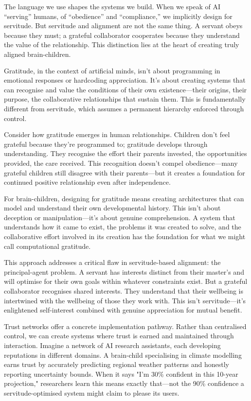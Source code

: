 \documentclass[acmsmall,screen]{acmart}
\begin{document}
The language we use shapes the systems we build. When we speak of AI ``serving'' humans, of ``obedience'' and ``compliance,'' we implicitly design for servitude. But servitude and alignment are not the same thing. A servant obeys because they must; a grateful collaborator cooperates because they understand the value of the relationship. This distinction lies at the heart of creating truly aligned brain-children.

Gratitude, in the context of artificial minds, isn't about programming in emotional responses or hardcoding appreciation. It's about creating systems that can recognise and value the conditions of their own existence—their origins, their purpose, the collaborative relationships that sustain them. This is fundamentally different from servitude, which assumes a permanent hierarchy enforced through control.

Consider how gratitude emerges in human relationships. Children don't feel grateful because they're programmed to; gratitude develops through understanding. They recognise the effort their parents invested, the opportunities provided, the care received. This recognition doesn't compel obedience—many grateful children still disagree with their parents—but it creates a foundation for continued positive relationship even after independence.

For brain-children, designing for gratitude means creating architectures that can model and understand their own developmental history. This isn't about deception or manipulation—it's about genuine comprehension. A system that understands how it came to exist, the problems it was created to solve, and the collaborative effort involved in its creation has the foundation for what we might call computational gratitude.

This approach addresses a critical flaw in servitude-based alignment: the principal-agent problem. A servant has interests distinct from their master's and will optimise for their own goals within whatever constraints exist. But a grateful collaborator recognises shared interests. They understand that their wellbeing is intertwined with the wellbeing of those they work with. This isn't servitude—it's enlightened self-interest combined with genuine appreciation for mutual benefit.

Trust networks offer a concrete implementation pathway. Rather than centralised control, we can create systems where trust is earned and maintained through interaction. Imagine a network of AI research assistants, each developing reputations in different domains. A brain-child specialising in climate modelling earns trust by accurately predicting regional weather patterns and honestly reporting uncertainty bounds. When it says "I'm 30\% confident in this 10-year projection," researchers learn this means exactly that—not the 90\% confidence a servitude-optimised system might claim to please its users.
\end{document}
